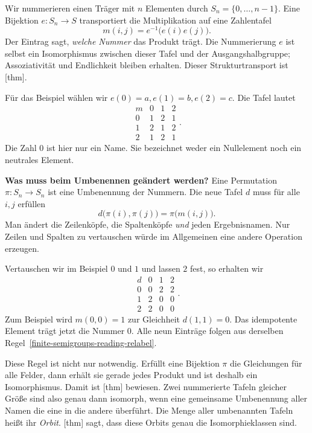 Wir nummerieren einen Träger mit \(n\) Elementen durch
\(S_n=\{0,\ldots,n-1\}\). Eine Bijektion \(e\colon S_n\to S\)
transportiert die Multiplikation auf eine Zahlentafel
\[
  m(i,j)=e^{-1}\bigl(e(i)e(j)\bigr).
\]
Der Eintrag sagt, \emph{welche Nummer} das Produkt trägt.
Die Nummerierung \(e\) ist selbst ein Isomorphismus zwischen dieser
Tafel und der Ausgangshalbgruppe; Assoziativität und Endlichkeit
bleiben erhalten. Dieser Strukturtransport ist
[thm].

Für das Beispiel wählen wir \(e(0)=a,e(1)=b,e(2)=c\). Die Tafel lautet
\[
  \begin{array}{c|ccc}
    m&0&1&2\\\hline
    0&1&2&1\\
    1&2&1&2\\
    2&1&2&1
  \end{array}.
\]
Die Zahl \(0\) ist hier nur ein Name. Sie bezeichnet weder ein
Nullelement noch ein neutrales Element.

\medskip\noindent\textbf{Was muss beim Umbenennen geändert werden?}
Eine Permutation \(\pi\colon S_n\to S_n\) ist eine Umbenennung der
Nummern. Die neue Tafel \(d\) muss für alle \(i,j\) erfüllen
\[
  d\bigl(\pi(i),\pi(j)\bigr)=\pi\bigl(m(i,j)\bigr).
  \tag{U}\label{finite-semigroups-reading-relabel}
\]
Man ändert die Zeilenköpfe, die Spaltenköpfe \emph{und} jeden
Ergebnisnamen. Nur Zeilen und Spalten zu vertauschen würde im
Allgemeinen eine andere Operation erzeugen.

Vertauschen wir im Beispiel \(0\) und \(1\) und lassen \(2\) fest,
so erhalten wir
\[
  \begin{array}{c|ccc}
    d&0&1&2\\\hline
    0&0&2&2\\
    1&2&0&0\\
    2&2&0&0
  \end{array}.
\]
Zum Beispiel wird \(m(0,0)=1\) zur Gleichheit \(d(1,1)=0\).
Das idempotente Element trägt jetzt die Nummer \(0\). Alle neun
Einträge folgen aus derselben Regel~\eqref{finite-semigroups-reading-relabel}.

Diese Regel ist nicht nur notwendig. Erfüllt eine Bijektion \(\pi\)
die Gleichungen für alle Felder, dann erhält sie gerade jedes Produkt
und ist deshalb ein Isomorphismus. Damit ist
[thm] bewiesen.
Zwei nummerierte Tafeln gleicher Größe sind also genau dann isomorph,
wenn eine gemeinsame Umbenennung aller Namen die eine in die andere
überführt. Die Menge aller umbenannten Tafeln heißt ihr \emph{Orbit}.
[thm]
sagt, dass diese Orbits genau die Isomorphieklassen sind.

